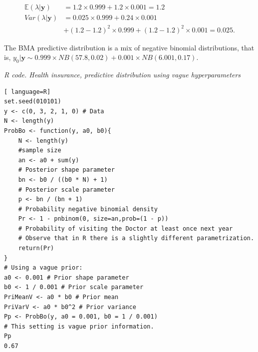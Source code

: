 \begin{align*}
	\mathbb{E}(\lambda|\mathbf{y})&=1.2\times 0.999+1.2\times 0.001=1.2\\
	Var(\lambda|\mathbf{y})&=0.025\times 0.999+0.24\times 0.001\\
	& + (1.2-1.2)^2\times 0.999 + (1.2-1.2)^2\times 0.001= 0.025.
\end{align*}

The BMA predictive distribution is a mix of negative binomial distributions, that is, $y_0|\mathbf{y}\sim 0.999\times NB(57.8, 0.02)+0.001\times NB(6.001, 0.17)$.

\begin{tcolorbox}[enhanced,width=4.67in,center upper,
	fontupper=\large\bfseries,drop shadow southwest,sharp corners]
\textit{R code. Health insurance, predictive distribution using vague hyperparameters}
\begin{VF}
\begin{lstlisting}[ language=R]
set.seed(010101)
y <- c(0, 3, 2, 1, 0) # Data
N <- length(y)
ProbBo <- function(y, a0, b0){
	N <- length(y)
	#sample size
	an <- a0 + sum(y) 
	# Posterior shape parameter
	bn <- b0 / ((b0 * N) + 1) 
	# Posterior scale parameter
	p <- bn / (bn + 1) 
	# Probability negative binomial density
	Pr <- 1 - pnbinom(0, size=an,prob=(1 - p)) 
	# Probability of visiting the Doctor at least once next year
	# Observe that in R there is a slightly different parametrization.
	return(Pr)
} 
# Using a vague prior:
a0 <- 0.001 # Prior shape parameter
b0 <- 1 / 0.001 # Prior scale parameter
PriMeanV <- a0 * b0 # Prior mean
PriVarV <- a0 * b0^2 # Prior variance
Pp <- ProbBo(y, a0 = 0.001, b0 = 1 / 0.001) 
# This setting is vague prior information.
Pp
0.67
\end{lstlisting}
\end{VF}
\end{tcolorbox} 

